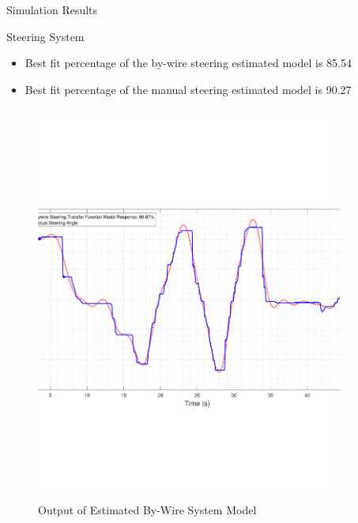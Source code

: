 \documentclass{beamer}
\begin{document}
\begin{frame}{Simulation Results}
  \begin{block}{Steering System}
 \begin{itemize}
	\item Best fit percentage of the by-wire steering estimated model is 85.54
	\item Best fit percentage of the manual steering estimated model is 90.27
 \end{itemize}
 \begin{figure}
    \centering
    \begin{minipage}{0.45\textwidth}
        \centering
        \includegraphics[width=0.9\textwidth]{figs/img/byWireSteeringTransferFunctionModel} %
        \caption{Output of Estimated By-Wire System Model}
        \label{fig:byWireSteerModel}
    \end{minipage}\hfill
    \begin{minipage}{0.45\textwidth}
        \centering

\end{minipage}
\end{figure}
\end{block}
\end{frame}
\end{document}
